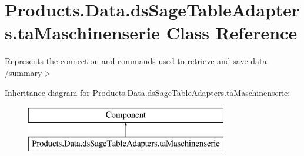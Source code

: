 \hypertarget{class_products_1_1_data_1_1ds_sage_table_adapters_1_1ta_maschinenserie}{}\section{Products.\+Data.\+ds\+Sage\+Table\+Adapters.\+ta\+Maschinenserie Class Reference}
\label{class_products_1_1_data_1_1ds_sage_table_adapters_1_1ta_maschinenserie}


Represents the connection and commands used to retrieve and save data. /summary$>$  


Inheritance diagram for Products.\+Data.\+ds\+Sage\+Table\+Adapters.\+ta\+Maschinenserie\+:\begin{figure}[H]
\begin{center}
\leavevmode
\includegraphics[height=2.000000cm]{class_products_1_1_data_1_1ds_sage_table_adapters_1_1ta_maschinenserie}
\end{center}
\end{figure}
